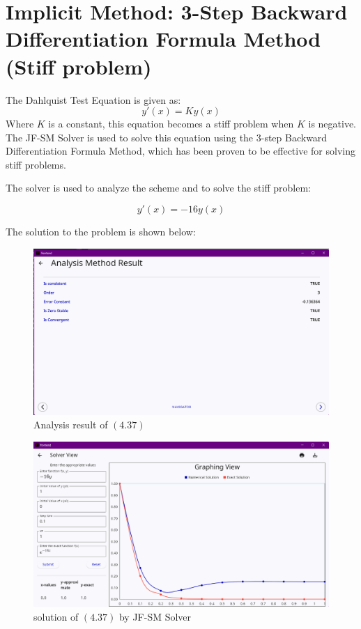 \documentclass[a4paper, twoside]{report} %
\begin{document}
	\newpage

	\section{Implicit Method: 3-Step Backward Differentiation Formula Method (Stiff problem)}


	The Dahlquist Test Equation is given as:
	\begin{equation}
		y'(x) = Ky(x)
	\end{equation}
	Where $K$ is a constant, this equation becomes a stiff problem when $K$ is negative. The JF-SM Solver is used to solve this equation using the 3-step Backward Differentiation Formula Method, which has been proven to be effective for solving stiff problems.

	The solver is used to analyze the scheme and to solve the stiff problem:

	\begin{equation}
		y'(x) = -16y(x)
	\end{equation}

	The solution to the problem is shown below:

	\begin{figure}[htbp]
		\centering
		\includegraphics[width=1\textwidth]{chapters/4/image/stiifa.png}
		\caption{Analysis result of $(4.37)$ }
	\end{figure}


	\begin{figure}[htbp]
		\centering
		\includegraphics[width=1\textwidth]{chapters/4/image/stiffb.png}
		\caption{solution of $(4.37)$ by JF-SM Solver}
	\end{figure}
\end{document}
